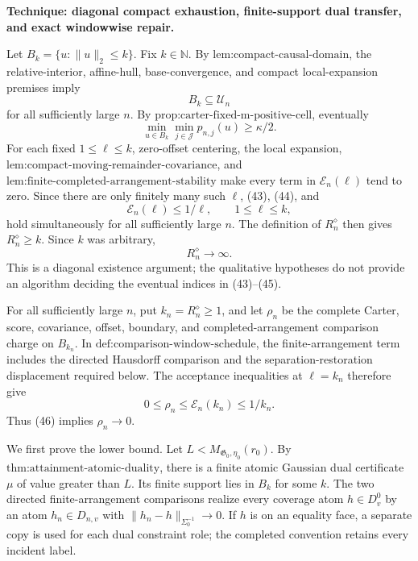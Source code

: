 \textbf{Technique: diagonal compact exhaustion, finite-support dual transfer, and exact windowwise repair.}

Let \(B_k=\{u:\|u\|_2\le k\}\).  Fix \(k\in\mathbb N\).  By \(\text{lem:compact-causal-domain}\), the relative-interior, affine-hull, base-convergence, and compact local-expansion premises imply
\[
 B_k\subseteq\mathcal U_n
 \tag{43}
\]
for all sufficiently large \(n\).  By \(\text{prop:carter-fixed-m-positive-cell}\), eventually
\[
 \min_{u\in B_k}\min_{j\in\mathcal J}p_{n,j}(u)\ge\kappa/2.
 \tag{44}
\]
For each fixed \(1\le\ell\le k\), zero-offset centering, the local expansion, \(\text{lem:compact-moving-remainder-covariance}\), and \(\text{lem:finite-completed-arrangement-stability}\) make every term in \(\mathscr E_n(\ell)\) tend to zero.  Since there are only finitely many such \(\ell\), (43), (44), and
\[
 \mathscr E_n(\ell)\le1/\ell,
 \qquad 1\le\ell\le k,
 \tag{45}
\]
hold simultaneously for all sufficiently large \(n\).  The definition of \(R_n^{\diamond}\) then gives \(R_n^{\diamond}\ge k\).  Since \(k\) was arbitrary,
\[
 R_n^{\diamond}\longrightarrow\infty.
 \tag{46}
\]
This is a diagonal existence argument; the qualitative hypotheses do not provide an algorithm deciding the eventual indices in (43)--(45).

For all sufficiently large \(n\), put \(k_n=R_n^{\diamond}\ge1\), and let \(\rho_n\) be the complete Carter, score, covariance, offset, boundary, and completed-arrangement comparison charge on \(B_{k_n}\).  In \(\text{def:comparison-window-schedule}\), the finite-arrangement term includes the directed Hausdorff comparison and the separation-restoration displacement required below.  The acceptance inequalities at \(\ell=k_n\) therefore give
\[
 0\le\rho_n\le\mathscr E_n(k_n)\le1/k_n.
 \tag{47}
\]
Thus (46) implies \(\rho_n\to0\).

We first prove the lower bound.  Let \(L<M_{\mathfrak G_0,\eta_0}(r_0)\).  By \(\text{thm:attainment-atomic-duality}\), there is a finite atomic Gaussian dual certificate \(\mu\) of value greater than \(L\).  Its finite support lies in \(B_k\) for some \(k\).  The two directed finite-arrangement comparisons realize every coverage atom \(h\in D_v^0\) by an atom \(h_n\in D_{n,v}\) with \(\|h_n-h\|_{\Sigma_0^{-1}}\to0\).  If \(h\) is on an equality face, a separate copy is used for each dual constraint role; the completed convention retains every incident label.

